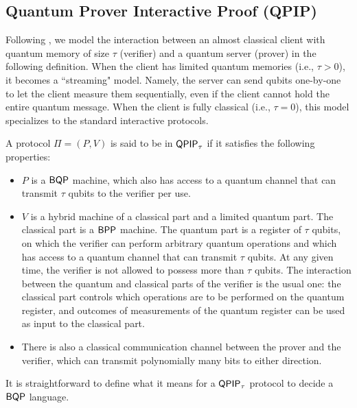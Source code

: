\subsection{Quantum Prover Interactive Proof (QPIP)} 
\label{sec:qpip_def}

Following \cite{FOCS:Mahadev18a}, we model the interaction between an almost classical client with quantum memory of size $\tau$ (verifier) and a quantum server (prover) in the following definition.
When the client has limited quantum memories (i.e., $\tau > 0$), it becomes a ``streaming" model. Namely, the server can send qubits one-by-one to let the client measure them sequentially, even if the client cannot hold the entire quantum message.
When the client is fully classical (i.e., $\tau = 0$), this model specializes to the standard interactive protocols.


\begin{definition}
    A protocol $\Pi=(P, V)$ is said to be in $\operatorname{\mathsf{QPIP}}_\tau$ if it satisfies the following properties:
    \begin{itemize}
        \item $P$ is a $\operatorname{\mathsf{BQP}}$ machine, which also has access to a quantum channel that can transmit $\tau$ qubits to the verifier per use.
        \item $V$ is a hybrid machine of a classical part and a limited quantum part. The classical part is a $\operatorname{\mathsf{BPP}}$ machine. The quantum part is a register of $\tau$ qubits, on which the verifier can perform arbitrary quantum operations and which has access to a quantum channel that can transmit $\tau$ qubits. At any given time, the verifier is not allowed to possess more than $\tau$ qubits. The interaction between the quantum and classical parts of the verifier is the usual one: the classical part controls which operations are to be performed on the quantum register, and outcomes of measurements of the quantum register can be used as input to the classical part.
        \item There is also a classical communication channel between the prover and the verifier, which can transmit polynomially many bits to either direction.
    \end{itemize}
\end{definition}

It is straightforward to define what it means for a $\operatorname{\mathsf{QPIP}}_\tau$ protocol to decide a $\operatorname{\mathsf{BQP}}$ language.

